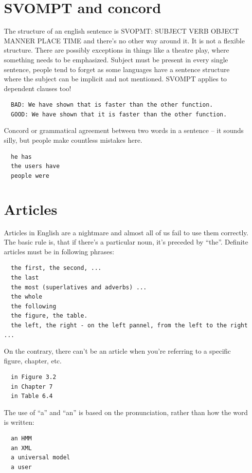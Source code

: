 \section{SVOMPT and concord}

The structure of an english sentence is SVOPMT: SUBJECT VERB OBJECT MANNER PLACE TIME and there's no other way around it. It is not a flexible structure. There are possibly exceptions in things like a theatre play, where something needs to be emphasized. Subject must be present in every single sentence, people tend to forget as some languages have a sentence structure where the subject can be implicit and not mentioned. SVOMPT applies to dependent clauses too!
\begin{verbatim}
  BAD: We have shown that is faster than the other function. 
  GOOD: We have shown that it is faster than the other function. 
\end{verbatim}

\noindent Concord or grammatical agreement between two words in a sentence -- it sounds silly, but people make countless mistakes here.

\begin{verbatim}
  he has 
  the users have 
  people were 
\end{verbatim}

\section{Articles}

Articles in English are a nightmare and almost all of us fail to use them correctly. The basic rule is, that if there's a particular noun, it's preceded by ``the''. Definite articles must be in following phrases:
\begin{verbatim}
  the first, the second, ...
  the last
  the most (superlatives and adverbs) ...
  the whole 
  the following 
  the figure, the table. 
  the left, the right - on the left pannel, from the left to the right ... 
\end{verbatim}

\noindent On the contrary, there can't be an article when you're referring to a specific figure, chapter, etc.
\begin{verbatim}
  in Figure 3.2
  in Chapter 7
  in Table 6.4
\end{verbatim}

\begin{samepage}
\noindent The use of ``a'' and ``an'' is based on the pronunciation, rather than how the word is written:
\begin{verbatim}
  an HMM
  an XML
  a universal model
  a user
\end{verbatim}
\end{samepage}

